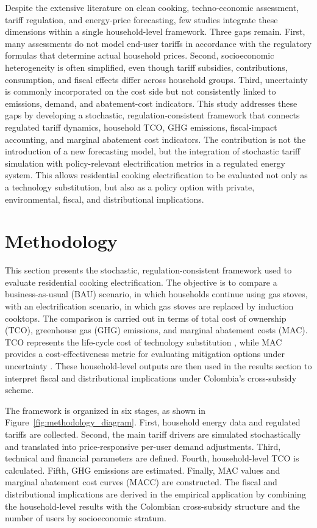 \documentclass[authoryear,preprint,review,10pt]{elsarticle}
\begin{document}
Despite the extensive literature on clean cooking, techno-economic assessment, tariff regulation, and energy-price forecasting, few studies integrate these dimensions within a single household-level framework. Three gaps remain. First, many assessments do not model end-user tariffs in accordance with the regulatory formulas that determine actual household prices. Second, socioeconomic heterogeneity is often simplified, even though tariff subsidies, contributions, consumption, and fiscal effects differ across household groups. Third, uncertainty is commonly incorporated on the cost side but not consistently linked to emissions, demand, and abatement-cost indicators. This study addresses these gaps by developing a stochastic, regulation-consistent framework that connects regulated tariff dynamics, household TCO, GHG emissions, fiscal-impact accounting, and marginal abatement cost indicators. The contribution is not the introduction of a new forecasting model, but the integration of stochastic tariff simulation with policy-relevant electrification metrics in a regulated energy system. This allows residential cooking electrification to be evaluated not only as a technology substitution, but also as a policy option with private, environmental, fiscal, and distributional implications.

\section{Methodology}
\label{methodology}

This section presents the stochastic, regulation-consistent framework used to evaluate residential cooking electrification. The objective is to compare a business-as-usual (BAU) scenario, in which households continue using gas stoves, with an electrification scenario, in which gas stoves are replaced by induction cooktops. The comparison is carried out in terms of total cost of ownership (TCO), greenhouse gas (GHG) emissions, and marginal abatement costs (MAC). TCO represents the life-cycle cost of technology substitution \citep{ellram1994taxonomy}, while MAC provides a cost-effectiveness metric for evaluating mitigation options under uncertainty \citep{clerc2013desarrollo}. These household-level outputs are then used in the results section to interpret fiscal and distributional implications under Colombia's cross-subsidy scheme.

The framework is organized in six stages, as shown in Figure~\ref{fig:methodology_diagram}. First, household energy data and regulated tariffs are collected. Second, the main tariff drivers are simulated stochastically and translated into price-responsive per-user demand adjustments. Third, technical and financial parameters are defined. Fourth, household-level TCO is calculated. Fifth, GHG emissions are estimated. Finally, MAC values and marginal abatement cost curves (MACC) are constructed. The fiscal and distributional implications are derived in the empirical application by combining the household-level results with the Colombian cross-subsidy structure and the number of users by socioeconomic stratum.
\end{document}
